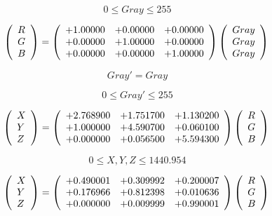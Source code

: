 \documentclass{article}
\begin{document}
\[ 0 \le Gray \le 255 \]
\pagebreak

\[ \left( \begin{array}{l} R \\ G \\ B \\ \end{array} \right) = \left( \begin{array}{lll} +1.00000 & +0.00000 & +0.00000 \\ +0.00000 & +1.00000 & +0.00000 \\ +0.00000 & +0.00000 & +1.00000 \\ \end{array} \right) \left( \begin{array}{l} Gray \\ Gray \\ Gray \\ \end{array} \right) \\ \]
\pagebreak

\[ Gray' = Gray \]
\pagebreak

\[ 0 \le Gray' \le 255 \]
\pagebreak

\[ \left( \begin{array}{l} X \\ Y \\ Z \\ \end{array} \right) = \left( \begin{array}{lll} +2.768900 & +1.751700 & +1.130200 \\ +1.000000 & +4.590700 & +0.060100 \\ +0.000000 & +0.056500 & +5.594300 \\ \end{array} \right) \left( \begin{array}{l} R \\ G \\ B \\ \end{array} \right) \\ \]
\pagebreak

\[ 0 \le X, Y, Z \le 1440.954 \]
\pagebreak

\[ \left( \begin{array}{l} X \\ Y \\ Z \\ \end{array} \right) = \left( \begin{array}{lll} +0.490001 & +0.309992 & +0.200007 \\ +0.176966 & +0.812398 & +0.010636 \\ +0.000000 & +0.009999 & +0.990001 \\ \end{array} \right) \left( \begin{array}{l} R \\ G \\ B \\ \end{array} \right) \\ \]
\pagebreak
\end{document}
